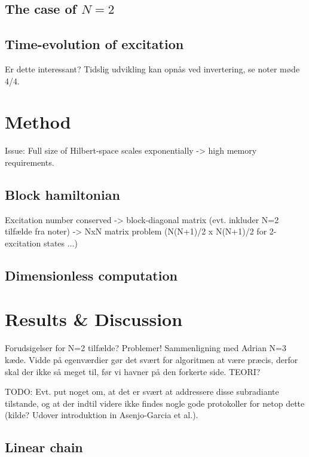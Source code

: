 \documentclass{article}
\begin{document}
\subsection{The case of $N=2$}\label{sec:N2}

\subsection{Time-evolution of excitation}

Er dette interessant? Tidslig udvikling kan opnås ved invertering, se noter møde 4/4.

\section{Method}

Issue: Full size of Hilbert-space scales exponentially -> high memory requirements.

\subsection{Block hamiltonian}\label{sec:block}

Excitation number conserved -> block-diagonal matrix (evt. inkluder N=2 tilfælde fra noter) -> NxN matrix problem (N(N+1)/2 x N(N+1)/2 for 2-excitation states ...)

\subsection{Dimensionless computation}\label{sec:dimless}

\section{Results \& Discussion}

Forudsigelser for N=2 tilfælde? Problemer! Sammenligning med Adrian N=3 kæde. Vidde på egenværdier gør det svært for algoritmen at være præcis, derfor skal der ikke så meget til, før vi havner på den forkerte side. TEORI?

TODO: Evt. put noget om, at det er svært at addressere disse subradiante tilstande, og at der indtil videre ikke findes nogle gode protokoller for netop dette (kilde? Udover introduktion in Asenjo-Garcia et al.). 

\subsection{Linear chain}
\end{document}
